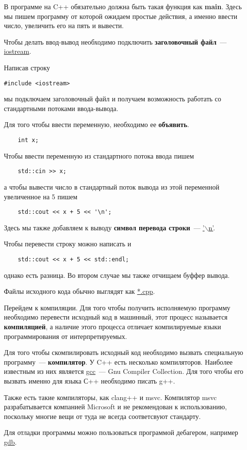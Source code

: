 В программе на C++ обязательно должна быть такая функция как \textbf{main}.
Здесь мы пишем программу от которой ожидаем простые действия, а именно ввести число, увеличить его на пять и вывести.

Чтобы делать ввод-вывод необходимо подключить \textbf{заголовочный файл}~--- \underline{iostream}.

Написав строку 
\begin{verbatim}
#include <iostream>
\end{verbatim}
мы подключаем заголовочный файл и получаем возможность работать со стандартными потоками ввода-вывода.

Для того чтобы ввести переменную, необходимо ее \textbf{объявить}. 
\begin{verbatim}
    int x;
\end{verbatim}

Чтобы ввести переменную из стандартного потока ввода пишем
\begin{verbatim}
    std::cin >> x;
\end{verbatim}

а чтобы вывести число в стандартный поток вывода из этой переменной увеличенное на 5 пишем
\begin{verbatim}
    std::cout << x + 5 << '\n';
\end{verbatim}

Здесь мы также добавляем к выводу \textbf{символ перевода строки}~--- \underline{'$\backslash$n'}.

Чтобы перевести строку можно написать и 
\begin{verbatim}
    std::cout << x + 5 << std::endl;
\end{verbatim}

однако есть разница. Во втором случае мы также отчищаем буффер вывода.

Файлы исходного кода обычно выглядят как \underline{*.cpp}.

Перейдем к компиляции. Для того чтобы получить исполняемую программу необходимо 
перевести исходный код в машинный, этот процесс называется \textbf{компиляцией}, а
наличие этого процесса отличает компилируемые языки программирования от интерпретируемых.

Для того чтобы скомпилировать исходный код необходимо вызвать специальную программу~--- \textbf{компилятор}.
У C++ есть несколько компиляторов. Наиболее известным из них является \underline{gcc}~--- Gnu Compiler Collection.
Для того чтобы его вызвать именно для языка С++ необходимо писать g++.

Также есть такие компиляторы, как clang++ и msvc.
Компилятор msvc разрабатывается компанией Microsoft и не рекомендован к использованию,
поскольку многие вещи от туда не всегда соответсвуют стандарту.

Для отладки программы можно пользоваться программой дебагером, например \underline{gdb}.